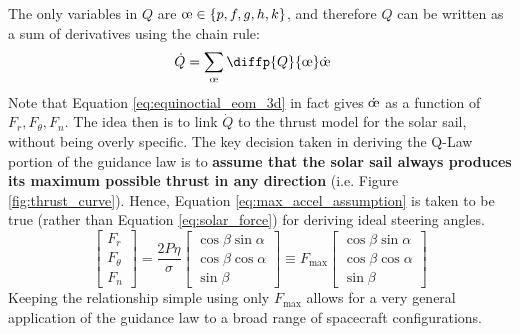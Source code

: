 The only variables in \(Q\) are \(\moe \in \{p, f, g, h, k\}\), and therefore \(Q\) can be written as a sum of derivatives using the chain rule:
\begin{align*}
    \dot{Q} & = \sum_{\moe} \diffp{Q}{{\moe}} \dot{\moe}
\end{align*}
Note that Equation \ref{eq:equinoctial_eom_3d} in fact gives \(\dot{\moe}\) as a function of \(F_r, F_\theta, F_n\). The idea then is to link \(\dot{Q}\) to the thrust model for the solar sail, without being overly specific. The key decision taken in deriving the Q-Law portion of the guidance law is to \textbf{assume that the solar sail always produces its maximum possible thrust in any direction} (i.e. Figure \ref{fig:thrust_curve}). Hence, Equation \ref{eq:max_accel_assumption} is taken to be true (rather than Equation \ref{eq:solar_force}) for deriving ideal steering angles.
\begin{equation}
    \begin{bmatrix}
        F_r      \\
        F_\theta \\
        F_n
    \end{bmatrix} =
    \frac{2P\eta}{\sigma}
    \begin{bmatrix}
        \cos \beta \sin \alpha \\
        \cos \beta \cos \alpha \\
        \sin \beta
    \end{bmatrix}
    \equiv
    F_{\max}
    \begin{bmatrix}
        \cos \beta \sin \alpha \\
        \cos \beta \cos \alpha \\
        \sin \beta
    \end{bmatrix}
    \label{eq:max_accel_assumption}
\end{equation}
Keeping the relationship simple using only \(F_{\max}\) allows for a very general application of the guidance law to a broad range of spacecraft configurations.

